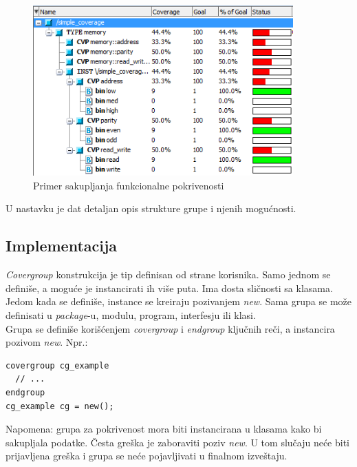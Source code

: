 

\begin{figure}[h!]
  \center
  \includegraphics[width=100mm, scale=0.5]{img/v11_simple_coverage.png}
  \caption{Primer sakupljanja funkcionalne pokrivenosti}
  \label{fig:simple_coverage}
\end{figure}

U nastavku je dat detaljan opis strukture grupe i njenih mogućnosti.


\subsection{Implementacija}

\emph{Covergroup} konstrukcija je tip definisan od strane korisnika. Samo jednom
se definiše, a moguće je instancirati ih više puta. Ima dosta sličnosti sa
klasama. Jedom kada se definiše, instance se kreiraju pozivanjem \emph{new}.
Sama grupa se može definisati u \emph{package}-u, modulu, program, interfesju
ili klasi.\\

Grupa se definiše korišćenjem \emph{covergroup} i \emph{endgroup} ključnih reči,
a instancira pozivom \emph{new}. Npr.:

\begin{lstlisting}
covergroup cg_example
  // ...
endgroup
cg_example cg = new();
\end{lstlisting}

Napomena: grupa za pokrivenost mora biti instancirana u klasama kako bi
sakupljala podatke. Česta greška je zaboraviti poziv \emph{new}. U tom slučaju
neće biti prijavljena greška i grupa se neće pojavljivati u finalnom
izveštaju.\\

